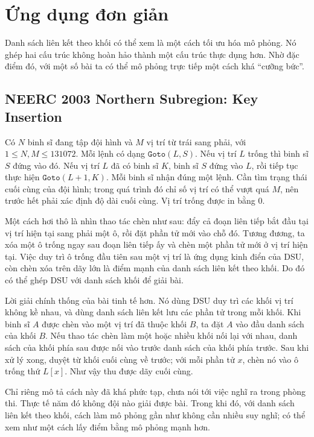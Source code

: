 \documentclass[11pt]{article}
\begin{document}
\section{Ứng dụng đơn giản}

Danh sách liên kết theo khối có thể xem là một cách tối ưu hóa mô phỏng. Nó
ghép hai cấu trúc không hoàn hảo thành một cấu trúc thực dụng hơn. Nhờ đặc
điểm đó, với một số bài ta có thể mô phỏng trực tiếp một cách khá ``cưỡng
bức''.

\subsection{NEERC 2003 Northern Subregion: Key Insertion}

Có \(N\) binh sĩ đang tập đội hình và \(M\) vị trí từ trái sang phải, với
\(1\le N,M\le 131072\). Mỗi lệnh có dạng \(\texttt{Goto}(L,S)\). Nếu vị trí
\(L\) trống thì binh sĩ \(S\) đứng vào đó. Nếu vị trí \(L\) đã có binh sĩ
\(K\), binh sĩ \(S\) đứng vào \(L\), rồi tiếp tục thực hiện
\(\texttt{Goto}(L+1,K)\). Mỗi binh sĩ nhận đúng một lệnh. Cần tìm trạng thái
cuối cùng của đội hình; trong quá trình đó chỉ số vị trí có thể vượt quá
\(M\), nên trước hết phải xác định độ dài cuối cùng. Vị trí trống được in
bằng \(0\).

Một cách hơi thô là nhìn thao tác chèn như sau: đẩy cả đoạn liên tiếp bắt đầu
tại vị trí hiện tại sang phải một ô, rồi đặt phần tử mới vào chỗ đó. Tương
đương, ta xóa một ô trống ngay sau đoạn liên tiếp ấy và chèn một phần tử mới
ở vị trí hiện tại. Việc duy trì ô trống đầu tiên sau một vị trí là ứng dụng
kinh điển của DSU, còn chèn xóa trên dãy lớn là điểm mạnh của danh sách liên
kết theo khối. Do đó có thể ghép DSU với danh sách khối để giải bài.

Lời giải chính thống của bài tinh tế hơn. Nó dùng DSU duy trì các khối vị trí
không kề nhau, và dùng danh sách liên kết lưu các phần tử trong mỗi khối. Khi
binh sĩ \(A\) được chèn vào một vị trí đã thuộc khối \(B\), ta đặt \(A\) vào
đầu danh sách của khối \(B\). Nếu thao tác chèn làm một hoặc nhiều khối nối
lại với nhau, danh sách của khối phía sau được nối vào trước danh sách của
khối phía trước. Sau khi xử lý xong, duyệt từ khối cuối cùng về trước; với
mỗi phần tử \(x\), chèn nó vào ô trống thứ \(L[x]\). Như vậy thu được dãy
cuối cùng.

Chỉ riêng mô tả cách này đã khá phức tạp, chưa nói tới việc nghĩ ra trong
phòng thi. Thực tế năm đó không đội nào giải được bài. Trong khi đó, với danh
sách liên kết theo khối, cách làm mô phỏng gần như không cần nhiều suy nghĩ;
có thể xem như một cách lấy điểm bằng mô phỏng mạnh hơn.
\end{document}
